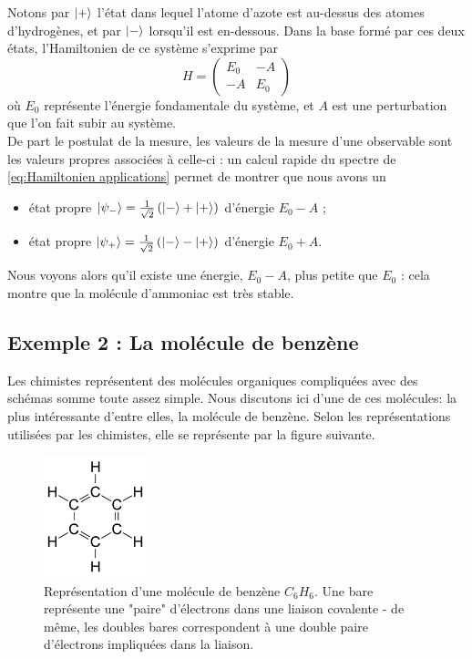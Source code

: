 \documentclass[../notesdecours.tex]{subfiles}
\begin{document}
Notons par $\ket{+}$ l'état dans lequel l'atome d'azote est au-dessus des atomes d'hydrogènes, et par $\ket{-}$ lorsqu'il est en-dessous. Dans la base formé par ces deux états, l'Hamiltonien de ce système s'exprime par
\begin{equation}
    H = 
    \begin{pmatrix}
        E_0 & -A\\
        -A & E_0
    \end{pmatrix}\label{eq:Hamiltonien applications}
\end{equation}
où $E_0$ représente l'énergie fondamentale du système, et $A$ est une perturbation que l'on fait subir au système.\\

De part le postulat de la mesure, les valeurs de la mesure d'une observable sont les valeurs propres associées à celle-ci : un calcul rapide du spectre de \eqref{eq:Hamiltonien applications} permet de montrer que nous avons un
\begin{itemize}
    \item état propre $\ket{\psi_-} = \frac{1}{\sqrt{2}}\left(\ket{-}+\ket{+}\right)$ d'énergie $E_0-A$ ;
    \item état propre $\ket{\psi_+} = \frac{1}{\sqrt{2}}\left(\ket{-}-\ket{+}\right)$ d'énergie $E_0+A$.
\end{itemize}

Nous voyons alors qu'il existe une énergie, $E_0-A$, plus petite que $E_0$ : cela montre que la molécule d'ammoniac est très stable.

\subsection*{Exemple 2 : La molécule de benzène}

\color{purple} Les chimistes représentent des molécules organiques compliquées avec des schémas somme toute assez simple. Nous discutons ici d'une de ces molécules: la plus intéressante d'entre elles, la molécule de benzène. Selon les représentations utilisées par les chimistes, elle se représente par la figure suivante.

\begin{figure}[h]
    \centering
    \includegraphics[width=3cm,scale=0.4]{Chapitre 5/Figure 3.png}
    \caption{Représentation d'une molécule de benzène $C_6H_6$. Une bare représente une "paire" d'électrons dans une liaison covalente - de même, les doubles bares correspondent à une double paire d'électrons impliquées dans la liaison.}
    \label{fig:molecule de benzene}
\end{figure}
\end{document}
